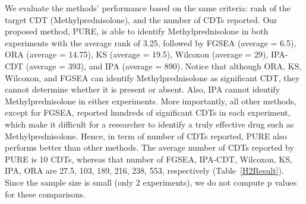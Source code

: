\documentclass[Minh_PhD_thesis.tex]{subfiles}
\begin{document}
We evaluate the methods' performance based on the same criteria: rank of the target CDT (Methylprednisolone), and the number of CDTs reported. Our proposed method, PURE, is able to identify Methylprednisolone in both experiments with the average rank of 3.25, followed by FGSEA (average = 6.5), ORA (average = 14.75), KS (average = 19.5), Wilcoxon (average = 29), IPA-CDT (average = 393), and IPA (average = 890). Notice that although ORA, KS, Wilcoxon, and FGSEA can identify Methylprednisolone as significant CDT, they cannot determine whether it is present or absent. Also, IPA cannot identify Methylprednisolone in either experiments. More importantly, all other methods, except for FGSEA, reported hundreds of significant CDTs in each experiment, which make it difficult for a researcher to identify a truly effective drug such as Methylprednisolone. Hence, in term of number of CDTs reported, PURE also performs better than other methods. The average number of CDTs reported by PURE is 10 CDTs, whereas that number of FGSEA, IPA-CDT, Wilcoxon, KS, IPA, ORA are 27.5, 103, 189, 216, 238, 553, respectively (Table~\ref{H2Result}). Since the sample size is small (only 2 experiments), we do not compute p values for these comparisons.
\end{document}
